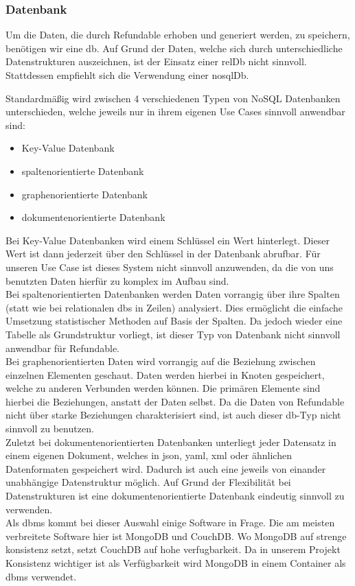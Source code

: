 		\subsubsection{Datenbank}
		Um die Daten, die durch Refundable erhoben und generiert werden, zu speichern, benötigen wir eine \gls{db}. Auf Grund der Daten, welche sich durch unterschiedliche Datenstrukturen auszeichnen, ist der Einsatz einer \gls{relDb} nicht sinnvoll. Stattdessen empfiehlt sich die Verwendung einer \gls{nosqlDb}.
		
		Standardmäßig wird zwischen 4 verschiedenen Typen von NoSQL Datenbanken unterschieden, welche jeweils nur in ihrem eigenen Use Cases sinnvoll anwendbar sind:
		\begin{itemize}
			
			\item Key-Value Datenbank
			\item spaltenorientierte Datenbank
			\item graphenorientierte Datenbank
			\item dokumentenorientierte Datenbank
		\end{itemize}			
		Bei Key-Value Datenbanken wird einem Schlüssel ein Wert hinterlegt. Dieser Wert ist dann jederzeit über den Schlüssel in der Datenbank abrufbar. Für unseren Use Case ist dieses System nicht sinnvoll anzuwenden, da die von uns benutzten Daten hierfür zu komplex im Aufbau sind.~\\
		Bei spaltenorientierten Datenbanken werden Daten vorrangig über ihre Spalten (statt wie bei relationalen \gls{db}s in Zeilen) analysiert. Dies ermöglicht die einfache Umsetzung statistischer Methoden auf Basis der Spalten. Da jedoch wieder eine Tabelle als Grundstruktur vorliegt, ist dieser Typ von Datenbank nicht sinnvoll anwendbar für Refundable.~\\
		Bei graphenorientierten Daten wird vorrangig auf die Beziehung zwischen einzelnen Elementen geschaut. Daten werden hierbei in Knoten gespeichert, welche zu anderen Verbunden werden können. Die primären Elemente sind hierbei die Beziehungen, anstatt der Daten selbst. Da die Daten von Refundable nicht über starke Beziehungen charakterisiert sind, ist auch dieser \gls{db}-Typ nicht sinnvoll zu benutzen.~\\		
		Zuletzt bei dokumentenorientierten Datenbanken unterliegt jeder Datensatz in einem eigenen Dokument, welches in \Gls{json}, \Gls{yaml}, \Gls{xml} oder ähnlichen Datenformaten gespeichert wird. Dadurch ist auch eine jeweils von einander unabhängige Datenstruktur möglich. Auf Grund der Flexibilität bei Datenstrukturen ist eine dokumentenorientierte Datenbank eindeutig sinnvoll zu verwenden.\cite{nosqltypes}~\\
		Als \gls{dbms} kommt bei dieser Auswahl einige Software in Frage. Die am meisten verbreitete Software hier ist MongoDB und CouchDB. Wo MongoDB auf strenge \gls{konsistenz} setzt, setzt CouchDB auf hohe \gls{verfugbarkeit}. Da in unserem Projekt Konsistenz wichtiger ist als Verfügbarkeit wird MongoDB in einem Container als \gls{dbms} verwendet.\cite{mongo}
		
